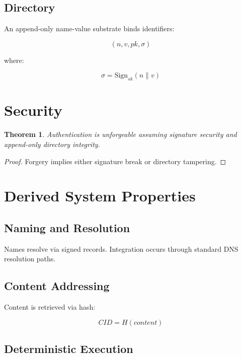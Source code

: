 \documentclass[11pt,a4paper]{article}
\newtheorem{theorem}{Theorem}[section]
\begin{document}
\subsection{Directory}

An append-only name-value substrate binds identifiers:

\begin{equation}
(n, v, pk, \sigma)
\end{equation}

where:

\begin{equation}
\sigma = \text{Sign}_{sk}(n \parallel v)
\end{equation}

\section{Security}

\begin{theorem}
Authentication is unforgeable assuming signature security and append-only directory integrity.
\end{theorem}

\begin{proof}
Forgery implies either signature break or directory tampering.
\end{proof}

\section{Derived System Properties}

\subsection{Naming and Resolution}

Names resolve via signed records. Integration occurs through standard DNS resolution paths.

\subsection{Content Addressing}

Content is retrieved via hash:

\begin{equation}
CID = H(content)
\end{equation}

\subsection{Deterministic Execution}
\end{document}
